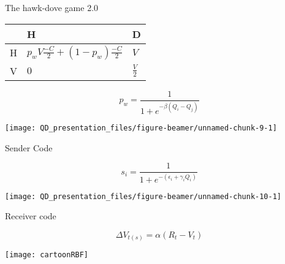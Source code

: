 \documentclass[
  ignorenonframetext,
]{beamer}
\begin{document}
\begin{frame}{The hawk-dove game 2.0}
\protect\hypertarget{the-hawk-dove-game-2.0}{}

\begin{center}
\begin{tabular}{ >{\centering\arraybackslash}p{1cm} | >{\centering\arraybackslash}p{4.5cm} | >{\centering\arraybackslash}p{4.5cm} }
& H & D \\ \hline
H & $p_w V\frac{-C}{2} + (1-p_w) \frac{-C}{2}$ & $V$ \\ \hline
V & $0$ & $\frac{V}{2}$\\
\end{tabular}
\end{center}

\begin{equation*}
p_w=\frac{1}{1+e^{-\beta(Q_i-Q_j)}}
\end{equation*}

\begin{center}\texttt{[image: QD\_presentation\_files/figure-beamer/unnamed-chunk-9-1]} \end{center}

\end{frame}

\begin{frame}{Sender Code}
\protect\hypertarget{sender-code}{}

\begin{equation*}
s_i = \frac{1}{1+e^{-(\epsilon_i+\gamma_iQ_i)}}
\label{eq:react_norm}
\end{equation*}

\begin{center}\texttt{[image: QD\_presentation\_files/figure-beamer/unnamed-chunk-10-1]} \end{center}

\end{frame}

\begin{frame}{Receiver code}
\protect\hypertarget{receiver-code}{}

\begin{equation*}
  \Delta V_{t(s)}=\alpha (R_t-V_t)
\end{equation*}

\begin{center}\texttt{[image: cartoonRBF]} \end{center}

\end{frame}
\end{document}
